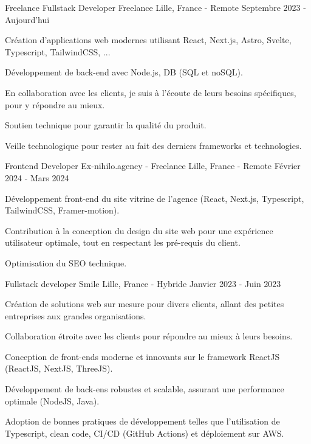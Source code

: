 
\begin{cventries}  \cventry
    {Freelance Fullstack Developer} %
    {Freelance} %
    {Lille, France - Remote} %
    {Septembre 2023 - Aujourd'hui} %
    {
      \begin{cvitems} %
        \item {Création d'applications web modernes utilisant React, Next.js, Astro, Svelte, Typescript, TailwindCSS, ...}
        \item {Développement de back-end avec Node.js, DB (SQL et noSQL).}
        \item {En collaboration avec les clients, je suis à l'écoute de leurs besoins spécifiques, pour y répondre au mieux.}
        \item {Soutien technique pour garantir la qualité du produit.}
        \item {Veille technologique pour rester au fait des derniers frameworks et technologies.}
      \end{cvitems}
    }

  \cventry
    {Frontend Developer} %
    {Ex-nihilo.agency - Freelance} %
    {Lille, France - Remote} %
    {Février 2024 - Mars 2024} %
    {
      \begin{cvitems} %
        \item {Développement front-end du site vitrine de l'agence (React, Next.js, Typescript, TailwindCSS, Framer-motion).}
        \item {Contribution à la conception du design du site web pour une expérience utilisateur optimale, tout en respectant les pré-requis du client.}
        \item {Optimisation du SEO technique.}
      \end{cvitems}
    }

  \cventry
    {Fullstack developer} %
    {Smile} %
    {Lille, France - Hybride} %
    {Janvier 2023 - Juin 2023} %
    {
      \begin{cvitems} %
        \item {Création de solutions web sur mesure pour divers clients, allant des petites entreprises aux grandes organisations.}
        \item {Collaboration étroite avec les clients pour répondre au mieux à leurs besoins.}
        \item {Conception de front-ends moderne et innovants sur le framework ReactJS (ReactJS, NextJS, ThreeJS).}
        \item {Développement de back-ens robustes et scalable, assurant une performance optimale (NodeJS, Java).}
        \item {Adoption de bonnes pratiques de développement telles que l'utilisation de Typescript, clean code, CI/CD (GitHub Actions) et déploiement sur AWS.}
      \end{cvitems}
    }


\end{cventries}

